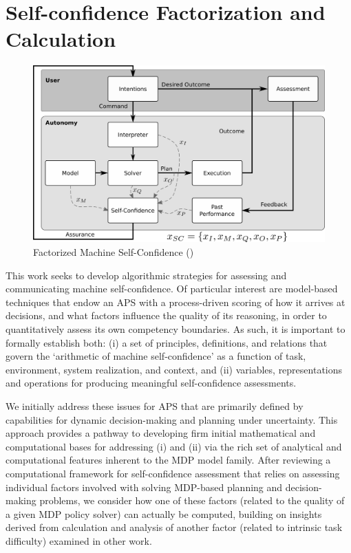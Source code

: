\section{Self-confidence Factorization and Calculation} \label{sec:self-confidence}
    \begin{figure}[tbp]
        \centering
        \includegraphics[width=0.80\linewidth]{Figures/FaMSeC.png}
        \caption{Factorized Machine Self-Confidence (\famsec)}
        \label{fig:famsec}
    \end{figure}
    
    This work seeks to develop algorithmic strategies for assessing and communicating machine self-confidence. Of particular interest are model-based techniques that endow an APS with a process-driven scoring of how it arrives at decisions, and what factors influence the quality of its reasoning, in order to quantitatively assess its own competency boundaries. As such, it is important to formally establish both: (i) a set of principles, definitions, and relations that govern the `arithmetic of machine self-confidence' as a function of task, environment, system realization, and context, and (ii) variables, representations and operations for producing meaningful self-confidence assessments. 
    
    We initially address these issues for APS that are primarily defined by capabilities for dynamic decision-making and planning under uncertainty. This approach provides a pathway to developing firm initial mathematical and computational bases for addressing (i) and (ii) via the rich set of analytical and computational features inherent to the MDP model family. %
    After reviewing a computational framework for self-confidence assessment that relies on assessing individual factors involved with solving MDP-based planning and decision-making problems, we consider how one of these factors (related to the quality of a given MDP policy solver) can actually be computed, building on insights derived from calculation and analysis of another factor (related to intrinsic task difficulty) examined in other work. 
    
